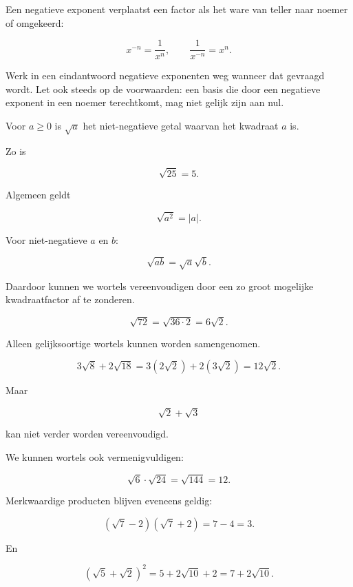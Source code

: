 \documentclass{ximera}
\begin{document}
  \begin{opmerking}
  Een negatieve exponent verplaatst een factor als het ware van teller naar noemer of omgekeerd:
  
  \[
  x^{-n}=\frac1{x^n},
  \qquad
  \frac1{x^{-n}}=x^n.
  \]
  
  Werk in een eindantwoord negatieve exponenten weg wanneer dat gevraagd wordt.
  Let ook steeds op de voorwaarden: een basis die door een negatieve exponent in een noemer terechtkomt, mag niet gelijk zijn aan nul.
  \end{opmerking}



Voor \(a\geq0\) is \(\sqrt a\) het niet-negatieve getal waarvan het kwadraat \(a\) is.

Zo is

\[
\sqrt{25}=5.
\]

Algemeen geldt

\[
\sqrt{a^2}=|a|.
\]

Voor niet-negatieve \(a\) en \(b\):

\[
\sqrt{ab}=\sqrt a\sqrt b.
\]

Daardoor kunnen we wortels vereenvoudigen door een zo groot mogelijke kwadraatfactor
af te zonderen.

\begin{voorbeeld}
\[
\sqrt{72}
=
\sqrt{36\cdot2}
=
6\sqrt2.
\]
\end{voorbeeld}



Alleen gelijksoortige wortels kunnen worden samengenomen.

\[
3\sqrt8+2\sqrt{18}
=
3(2\sqrt2)+2(3\sqrt2)
=
12\sqrt2.
\]

Maar

\[
\sqrt2+\sqrt3
\]

kan niet verder worden vereenvoudigd.



We kunnen wortels ook vermenigvuldigen:

\[
\sqrt6\cdot\sqrt{24}
=
\sqrt{144}
=
12.
\]

Merkwaardige producten blijven eveneens geldig:

\[
(\sqrt7-2)(\sqrt7+2)
=
7-4
=
3.
\]

En

\[
(\sqrt5+\sqrt2)^2
=
5+2\sqrt{10}+2
=
7+2\sqrt{10}.
\]
\end{document}
